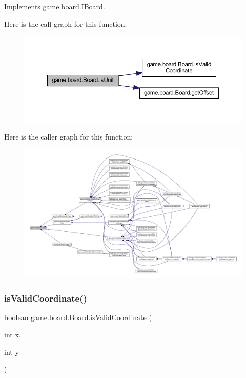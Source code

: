 Implements \mbox{\hyperlink{interfacegame_1_1board_1_1_i_board_aeb50b7b22128aaddcbea6330ba78a03e}{game.\+board.\+I\+Board}}.

Here is the call graph for this function\+:
\nopagebreak
\begin{figure}[H]
\begin{center}
\leavevmode
\includegraphics[width=350pt]{classgame_1_1board_1_1_board_aed65bda6e81b3ddbc14fa80bd52ac992_cgraph}
\end{center}
\end{figure}
Here is the caller graph for this function\+:
\nopagebreak
\begin{figure}[H]
\begin{center}
\leavevmode
\includegraphics[width=350pt]{classgame_1_1board_1_1_board_aed65bda6e81b3ddbc14fa80bd52ac992_icgraph}
\end{center}
\end{figure}
\mbox{\label{classgame_1_1board_1_1_board_a02574586e2f8c3d6c4dd1672efdf0d68}} 
\subsubsection{\texorpdfstring{is\+Valid\+Coordinate()}{isValidCoordinate()}}
{\footnotesize\ttfamily boolean game.\+board.\+Board.\+is\+Valid\+Coordinate (\begin{DoxyParamCaption}\item[{int}]{x,  }\item[{int}]{y }\end{DoxyParamCaption})\hspace{0.3cm}{\ttfamily [inline]}}


